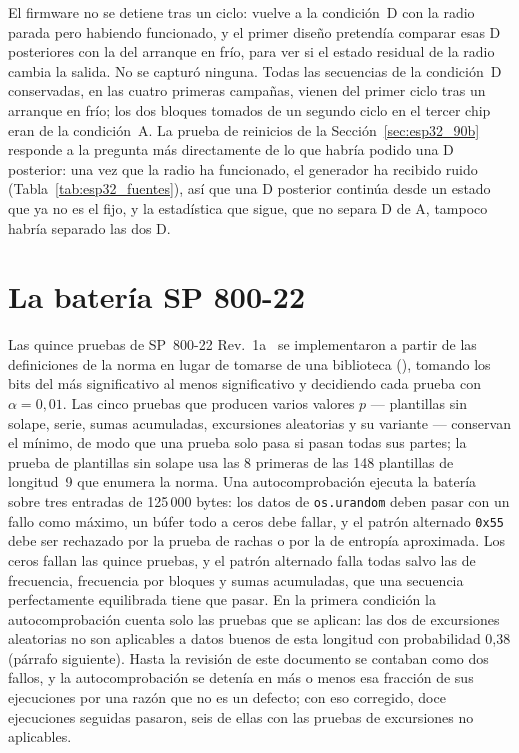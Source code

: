 El firmware no se detiene tras un ciclo: vuelve a la condición~D con la
radio parada pero habiendo funcionado, y el primer diseño pretendía
comparar esas D posteriores con la del arranque en frío, para ver si el
estado residual de la radio cambia la salida. No se capturó ninguna.
Todas las secuencias de la condición~D conservadas, en las cuatro
primeras campañas, vienen del primer ciclo tras un arranque en frío; los dos
bloques tomados de un segundo ciclo en el tercer chip eran de la
condición~A. La prueba de reinicios de la Sección~\ref{sec:esp32_90b}
responde a la pregunta más directamente de lo que habría podido una D
posterior: una vez que la radio ha funcionado, el generador ha recibido
ruido (Tabla~\ref{tab:esp32_fuentes}), así que una D posterior continúa
desde un estado que ya no es el fijo, y la estadística que sigue, que no
separa D de A, tampoco habría separado las dos D.

\section{La batería SP 800-22}
\label{sec:esp32_sp80022}

Las quince pruebas de SP~800-22 Rev.~1a~\cite{bassham_2010_sp80022} se
implementaron a partir de las definiciones de la norma en lugar de
tomarse de una biblioteca (),
tomando los bits del más significativo al menos significativo y
decidiendo cada prueba con $\alpha = 0{,}01$. Las cinco pruebas que
producen varios valores $p$ --- plantillas sin solape, serie, sumas
acumuladas, excursiones aleatorias y su variante --- conservan el mínimo,
de modo que una prueba solo pasa si pasan todas sus partes; la prueba de
plantillas sin solape usa las 8 primeras de las 148 plantillas de
longitud~9 que enumera la norma. Una autocomprobación ejecuta la batería
sobre tres entradas de 125\,000 bytes: los datos de \texttt{os.urandom}
deben pasar con un fallo como máximo, un búfer todo a ceros debe fallar,
y el patrón alternado \texttt{0x55} debe ser rechazado por la prueba de
rachas o por la de entropía aproximada. Los ceros fallan las
quince pruebas, y el patrón alternado falla todas salvo las de
frecuencia, frecuencia por bloques y sumas acumuladas, que una secuencia
perfectamente equilibrada tiene que pasar. En la primera condición la
autocomprobación cuenta solo las pruebas que se aplican: las dos de
excursiones aleatorias no son aplicables a datos buenos de esta longitud
con probabilidad 0,38 (párrafo siguiente). Hasta la revisión de este
documento se contaban como dos fallos, y la autocomprobación se detenía
en más o menos esa fracción de sus ejecuciones por una razón que no es un
defecto; con eso corregido, doce ejecuciones seguidas pasaron, seis de
ellas con las pruebas de excursiones no aplicables.

